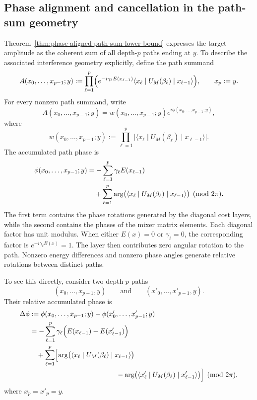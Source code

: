 \documentclass[a4paper,onecolumn,11pt,unpublished]{quantumarticle}
\theoremstyle{remark}
\begin{document}
\subsection{Phase alignment and cancellation in the path-sum geometry}
\label{subsec:phase-alignment-and-cancellation}

Theorem~\ref{thm:phase-aligned-path-sum-lower-bound} expresses the
target amplitude as the coherent sum of all depth-\(p\) paths ending at
\(y\). To describe the associated interference geometry explicitly,
define the path summand
\begin{equation}
\label{eq:depth-p-path-summand}
A(x_0,\ldots,x_{p-1};y)
:=
\prod_{\ell=1}^{p}
\Bigl(
e^{-i\gamma_\ell E(x_{\ell-1})}
\langle x_\ell\mid U_M(\beta_\ell)\mid x_{\ell-1}\rangle
\Bigr),
\qquad
x_p:=y.
\end{equation}
For every nonzero path summand, write
\begin{equation*}
\label{eq:depth-p-path-polar-form}
A(x_0,\ldots,x_{p-1};y)
=
w(x_0,\ldots,x_{p-1};y)
e^{i\phi(x_0,\ldots,x_{p-1};y)},
\end{equation*}
where
\begin{equation*}
\label{eq:depth-p-path-weight}
w(x_0,\ldots,x_{p-1};y)
:=
\prod_{\ell=1}^{p}
\bigl|
\langle x_\ell\mid U_M(\beta_\ell)\mid x_{\ell-1}\rangle
\bigr|.
\end{equation*}
The accumulated path phase is
\begin{align}
\label{eq:depth-p-accumulated-path-phase}
\phi(x_0,\ldots,x_{p-1};y)
&=
-\sum_{\ell=1}^{p}
\gamma_\ell E(x_{\ell-1})
\notag\\
&\quad
+
\sum_{\ell=1}^{p}
\arg
\bigl(
\langle x_\ell\mid
U_M(\beta_\ell)
\mid x_{\ell-1}\rangle
\bigr)
\pmod{2\pi}.
\end{align}
The first term contains the phase rotations generated by the diagonal
cost layers, while the second contains the phases of the mixer matrix
elements. Each diagonal factor has unit modulus. When either \(E(x)=0\) or \(\gamma_\ell=0\), the corresponding factor is \(e^{-i\gamma_\ell E(x)} =1.\) The layer then contributes zero angular rotation to the path. Nonzero energy differences and nonzero phase angles generate relative rotations between distinct paths.

To see this directly, consider two depth-\(p\) paths
\[
(x_0,\ldots,x_{p-1},y)
\qquad\text{and}\qquad
(x'_0,\ldots,x'_{p-1},y).
\]
Their relative accumulated phase is
\begin{align}
\label{eq:relative-depth-p-path-phase}
\Delta\phi
&:=
\phi(x_0,\ldots,x_{p-1};y)
-
\phi(x'_0,\ldots,x'_{p-1};y)
\notag\\
&=
-\sum_{\ell=1}^{p}
\gamma_\ell
\Bigl(
E(x_{\ell-1})-E(x'_{\ell-1})
\Bigr)
\notag\\
&\quad
+
\sum_{\ell=1}^{p}
\Bigl[
\arg
\bigl(
\langle x_\ell\mid
U_M(\beta_\ell)
\mid x_{\ell-1}\rangle
\bigr)
\notag\\
&\hspace{4.4cm}
-
\arg
\bigl(
\langle x'_\ell\mid
U_M(\beta_\ell)
\mid x'_{\ell-1}\rangle
\bigr)
\Bigr]
\pmod{2\pi},
\end{align}
where \(x_p=x'_p=y\).
\end{document}
